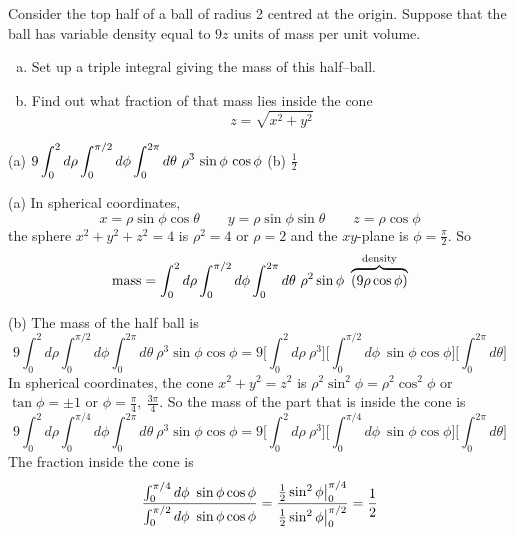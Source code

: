\begin{question}[M200 2000D] %
Consider the top half of a ball of radius 2 centred at the
origin. Suppose that the ball has variable density equal to $9z$ units
of mass per unit volume.
\begin{enumerate}[(a)]
\item 
Set up a triple integral giving the mass of this half--ball.

\item
Find out what fraction of that mass lies inside the cone
\begin{equation*}
z=\sqrt{x^2+y^2}
\end{equation*}
\end{enumerate}
\end{question}

%

\begin{answer}
(a) $\dst 9\int_0^2d\rho\int_0^{\pi/2}d\phi\int_0^{2\pi}d\theta\ 
            \rho^3\,\sin\phi\,\cos\phi$\qquad
(b) $\frac{1}{2}$
\end{answer}

\begin{solution}
(a) In spherical coordinates,
\begin{equation*}
x=\rho\sin\phi\cos\theta\qquad y=\rho\sin\phi\sin\theta\qquad z=\rho\cos\phi
\end{equation*}
the sphere $x^2+y^2+z^2=4$ is $\rho^2=4$ or $\rho=2$ and the 
$xy$-plane is $\phi=\frac{\pi}{2}$. So
\begin{equation*}
\text{mass}
=\int_0^2d\rho\int_0^{\pi/2}d\phi\int_0^{2\pi}d\theta\ \rho^2\sin\phi
\ \overbrace{(9 \rho\cos\phi)}^{\rm density}
\end{equation*}

(b) The mass of the half ball is
\begin{equation*}
9 \int_0^2d\rho\int_0^{\pi/2}d\phi\int_0^{2\pi}d\theta\ \rho^3\sin\phi \cos\phi
=9 \bigg[\int_0^2d\rho\ \rho^3\bigg]
  \bigg[\int_0^{\pi/2}d\phi\ \sin\phi \cos\phi\bigg]
  \bigg[\int_0^{2\pi}d\theta\bigg]
\end{equation*}
In spherical coordinates, the 
cone $x^2+y^2=z^2$ is $\rho^2\sin^2\phi=\rho^2\cos^2\phi$ or 
$\tan\phi=\pm1$ or $\phi=\frac{\pi}{4},\ \frac{3\pi}{4}$. So the mass
of the part that is inside the cone is
\begin{equation*}
9 \int_0^2d\rho\int_0^{\pi/4}d\phi\int_0^{2\pi}d\theta\ \rho^3\sin\phi \cos\phi
=9 \bigg[\int_0^2d\rho\ \rho^3\bigg]
  \bigg[\int_0^{\pi/4}d\phi\ \sin\phi \cos\phi\bigg]
  \bigg[\int_0^{2\pi}d\theta\bigg]
\end{equation*}
The fraction inside the cone is
\begin{equation*}
\frac{\int_0^{\pi/4}d\phi\ \sin\phi \cos\phi}{\int_0^{\pi/2}d\phi\ \sin\phi \cos\phi}
=\frac{\tfrac{1}{2}\sin^2\phi\big|_0^{\pi/4}}{\tfrac{1}{2}\sin^2\phi\big|_0^{\pi/2}}
=\frac{1}{2}
\end{equation*}
\end{solution}



